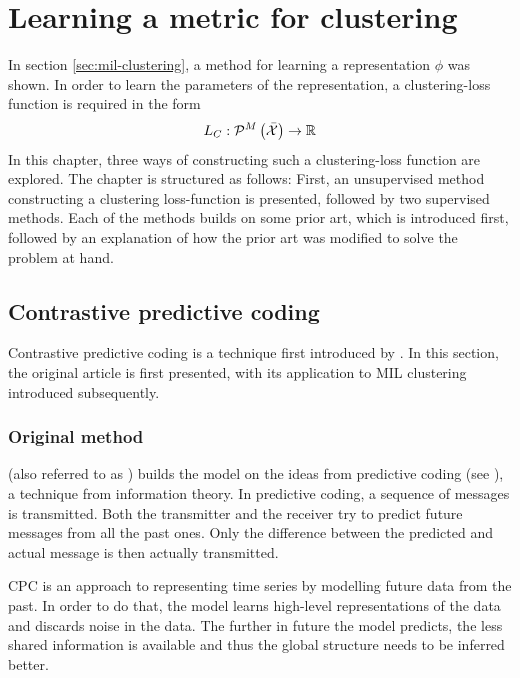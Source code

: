 \chapter{Learning a metric for clustering}\label{chap:clustering-metric}
In section \ref{sec:mil-clustering}, a method for learning a representation \( \phi \) was shown. In order to learn the parameters of the representation, a clustering-loss function is required in the form
\[ L_C : \mathcal{P}^M \left( \bar{\mathcal{X}} \right) \to \mathbb{R} \]
In this chapter, three ways of constructing such a clustering-loss function are explored. The chapter is structured as follows: First, an unsupervised method constructing a clustering loss-function is presented, followed by two supervised methods. Each of the methods builds on some prior art, which is introduced first, followed by an explanation of how the prior art was modified to solve the problem at hand.

\section{Contrastive predictive coding}
Contrastive predictive coding is a technique first introduced by \cite{oord_representation_2019}. In this section, the original article is first presented, with its application to MIL clustering introduced subsequently.

\subsection{Original method}
 (also referred to as ) builds the model on the ideas from predictive coding (see \cite{elias_predictive_1955}), a technique from information theory. In predictive coding, a sequence of messages is transmitted. Both the transmitter and the receiver try to predict future messages from all the past ones. Only the difference between the predicted and actual message is then actually transmitted.

CPC is an approach to representing time series by modelling future data from the past. In order to do that, the model learns high-level representations of the data and discards noise in the data. The further in future the model predicts, the less shared information is available and thus the global structure needs to be inferred better.

